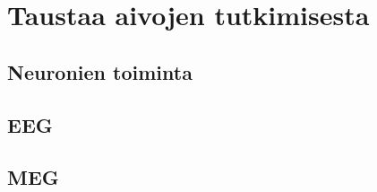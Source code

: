 \section{Taustaa aivojen tutkimisesta}
\subsection{Neuronien toiminta}
\cite[s. 50]{niedermeyer2011niedermeyer}

\subsection{EEG}
\citep{niedermeyer2011niedermeyer}

\citep{Michel2004EEGImaging}

\citep{Nunez2006ElectricEEG}

\citep{Baillet2001ElectromagneticMapping}

\subsection{MEG}
\citep{Hamalainen1993MagnetoencephalographytheoryBrain}

\citep{niedermeyer2011niedermeyer}

\citep{Baillet2001ElectromagneticMapping}